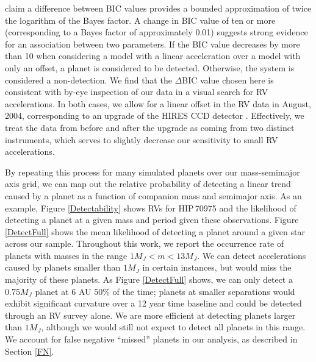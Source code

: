 \citet{Kass95} claim a difference between BIC values provides a bounded approximation of twice the logarithm of the Bayes factor. A change in BIC value of ten or more (corresponding to a Bayes factor of approximately 0.01) suggests strong evidence for an association between two parameters. If the BIC value decreases by more than 10 when considering a model with a linear acceleration over a model with only an offset, a planet is considered to be detected. Otherwise, the system is considered a non-detection. We find that the $\Delta$BIC value chosen here is consistent with by-eye inspection of our data in a visual search for RV accelerations. In both cases, we allow for a linear offset in the RV data in August, 2004, corresponding to an upgrade of the HIRES CCD detector \citep{Wright11}. Effectively, we treat the data from before and after the upgrade as coming from two distinct instruments, which serves to slightly decrease our sensitivity to small RV accelerations.

By repeating this process for many simulated planets over our mass-semimajor axis grid, we can map out the relative probability of detecting a linear trend caused by a planet as a function of companion mass and semimajor axis. As an example, Figure \ref{Detectability} shows RVs for HIP\,70975 and the likelihood of detecting a planet at a given mass and period given these observations. Figure \ref{DetectFull} shows the mean likelihood of detecting a planet around a given star across our sample. Throughout this work, we report the occurrence rate of planets with masses in the range $1 M_J < m < 13 M_J$. We can detect accelerations caused by planets smaller than $1 M_J$ in certain instances, but would miss the majority of these planets. As Figure \ref{DetectFull} shows, we can only detect a $0.75 M_J$ planet at 6 AU $50\%$ of the time; planets at smaller separations would exhibit significant curvature over a 12 year time baseline and could be detected through an RV survey alone. We are more efficient at detecting planets larger than $1 M_J$, although we would still not expect to detect all planets in this range. We account for false negative ``missed'' planets in our analysis, as described in Section \ref{FN}.




